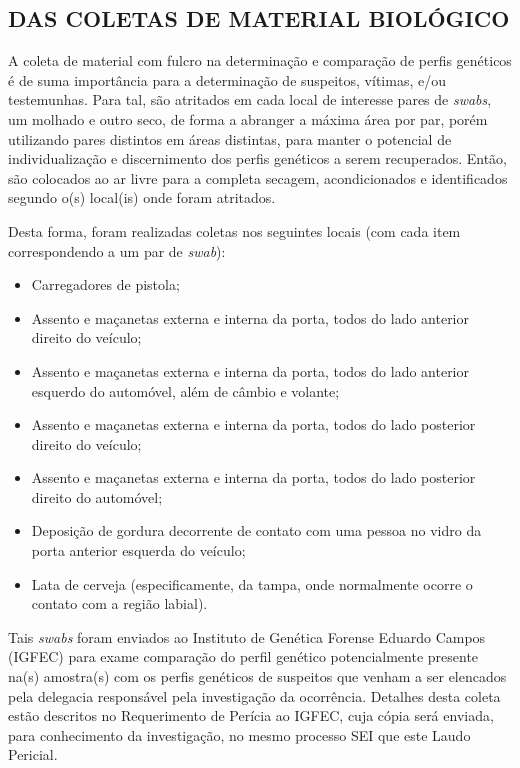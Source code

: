 \documentclass[a4paper,12pt,oneside]{article}
\newcommand{\igfec}{Instituto de Genética Forense Eduardo Campos (IGFEC) para exame comparação do perfil genético potencialmente presente na(s) amostra(s) com os perfis genéticos de suspeitos que venham a ser elencados pela delegacia responsável pela investigação da ocorrência. Detalhes desta coleta estão descritos no Requerimento de Perícia ao IGFEC, cuja cópia será enviada, para conhecimento da investigação, no mesmo processo SEI que este Laudo Pericial}
\newcounter{c}
\newcounter{d}
\newcounter{u}
\begin{document}
\subsection{DAS COLETAS DE MATERIAL BIOLÓGICO \label{biologia}}

A coleta de material com fulcro na determinação e comparação de perfis genéticos é de suma importância para a determinação de suspeitos, vítimas, e/ou testemunhas. Para tal, são atritados em cada local de interesse pares de {\sl swabs}, um molhado e outro seco, de forma a abranger a máxima área por par, porém utilizando pares distintos em áreas distintas, para manter o potencial de individualização e discernimento dos perfis genéticos a serem recuperados. Então, são colocados ao ar livre para a completa secagem, acondicionados e identificados segundo o(s) local(is) onde foram atritados.

Desta forma, foram realizadas coletas nos seguintes locais (com cada item correspondendo a um par de {\sl swab}):

\begin{itemize}
	\item Carregadores de pistola;
	\item Assento e maçanetas externa e interna da porta, todos do lado anterior direito do veículo;
	\item Assento e maçanetas externa e interna da porta, todos do lado anterior esquerdo do automóvel, além de câmbio e volante;
	\item Assento e maçanetas externa e interna da porta, todos do lado posterior direito do veículo;
	\item Assento e maçanetas externa e interna da porta, todos do lado posterior direito do automóvel;
	\item Deposição de gordura decorrente de contato com uma pessoa no vidro da porta anterior esquerda do veículo;
	\item Lata de cerveja (especificamente, da tampa, onde normalmente ocorre o contato com a região labial).
\end{itemize}

Tais {\sl swabs} foram enviados ao \igfec.


\end{document}

